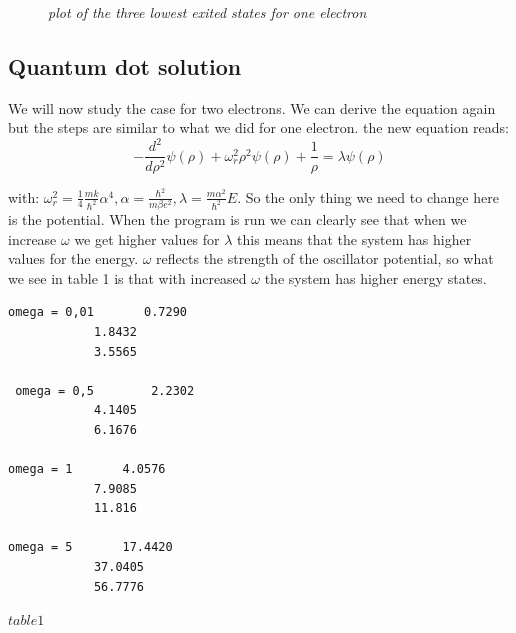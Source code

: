 \documentclass[norsk,a4paper,12pt]{article}
\begin{document}
\begin{figure}[H]
  \begin{center}
  \end{center}
 \caption{\textit{plot of the three lowest exited states for one electron}}
  \label{fig:edge}
\end{figure}


\subsection*{Quantum dot solution}

We will now study the case for two electrons. We can derive the equation again but the steps are similar to what we did for one electron.
the new equation reads:
\begin{equation}
 -\frac{d^2}{d\rho^2} \psi(\rho) + \omega_r^2\rho^2\psi(\rho) +\frac{1}{\rho} = \lambda \psi(\rho)
\end{equation}

with: $\omega_r^2=\frac{1}{4}\frac{mk}{\hbar^2} \alpha^4, \alpha = \frac{\hbar^2}{m\beta e^2}, \lambda = \frac{m\alpha^2}{\hbar^2}E$.
So the only thing we need to change here is the potential. When the program is run we can clearly see that when we increase $\omega$
we get higher values for $\lambda$ this means that the system has higher values for the energy. $\omega$ reflects the strength
of the oscillator potential, so what we see in table 1 is that with increased $\omega$ the system has higher energy states.

\begin{lstlisting}[frame=single]
 omega = 0,01       0.7290
		    1.8432
		    3.5565

 omega = 0,5        2.2302
		    4.1405
		    6.1676

omega = 1	    4.0576
		    7.9085
		    11.816

omega = 5 	    17.4420
		    37.0405
		    56.7776

\end{lstlisting}
$table 1$
\end{document}
